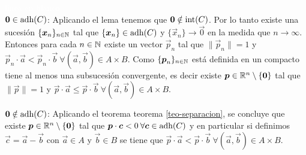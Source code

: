 \begin{demostracion}\textcolor{white}{linea en blanco}
\\ $\boldsymbol{0} \in \text{adh}({C})$: Aplicando el lema tenemos que $\boldsymbol{0}\notin \text{int}({C})$. Por lo tanto existe una sucesi\'on $\{\boldsymbol{x}_n\}_{n\in \mathbb{N}}$ tal que $\{\boldsymbol{x}_n\}\in \text{adh}({C})$ y $\{\vec{x}_n\}\to \vec{0}$ en la medida que $n\to \infty$. Entonces para cada $n\in \mathbb{N}$ existe un vector $\vec{p}_n$ tal que $\|\vec{p}_n\|=1$ y $\vec{p}_n\cdot \vec{a} < \vec{p}_n\cdot \vec{b} \:\forall (\vec{a},\vec{b})\in A\times B$. Como $\{\boldsymbol{p}_n\}_{n\in \mathbb{N}}$ est\'a definida en un compacto tiene al menos una subsucesi\'on convergente, es decir existe $\boldsymbol{p}\in \mathbb{R}^n\setminus \{\boldsymbol{0}\}$ tal que $\|\vec{p}\|=1$ y $\vec{p}\cdot \vec{a} \leq \vec{p}\cdot \vec{b} \:\forall (\vec{a},\vec{b})\in A\times B$.

\medskip

$\boldsymbol{0} \notin \text{adh}({C})$: Aplicando el teorema teorema \ref{teo-separacion}, se concluye que existe $\boldsymbol{p}\in \mathbb{R}^n\setminus \{\boldsymbol{0}\}$ tal que $\boldsymbol{p}\cdot \boldsymbol{c} < 0 \:\forall \boldsymbol{c}\in \text{adh}({C})$ y en particular si definimos $\vec{c}=\vec{a}-\vec{b}$ con $\vec{a}\in A$ y $\vec{b}\in B$ se tiene que $\vec{p}\cdot \vec{a} < \vec{p}\cdot \vec{b} \:\forall (\vec{a},\vec{b})\in A\times B$.
\end{demostracion}




